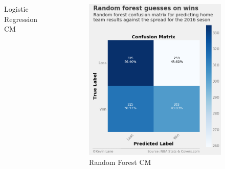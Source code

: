 \documentclass{beamer}
\begin{document}
\begin{frame}
\begin{columns}
\begin{figure}
\caption{Logistic Regression CM}
\end{figure}
\vspace{-1cm}
\begin{figure}
\includegraphics[scale=0.23]{../docs/assets/images/model-performance/random-forest-confusion-matrix.png}
\caption{Random Forest CM}
\end{figure}
\end{columns}
\end{frame}
\end{document}
